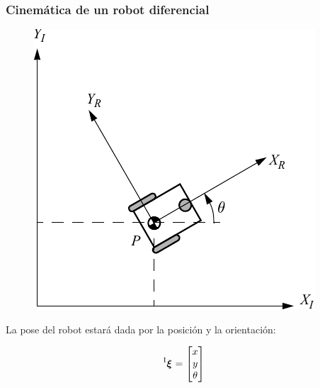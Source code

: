 \begin{frame}
    \frametitle{Cinemática de un robot diferencial}

    \begin{figure}
        \includegraphics[width=0.3\columnwidth]{./images/coordinate_systems.pdf}
    \end{figure}

    La pose del robot estará dada por la posición y la orientación:

    \begin{equation*}
        \prescript{\mathrm{I}}{}{{\boldsymbol{\mathbf{\xi}}}_\mathrm{}} =
        \begin{bmatrix}
            x\\
            y\\
            \theta
        \end{bmatrix}
    \end{equation*}
\end{frame}


